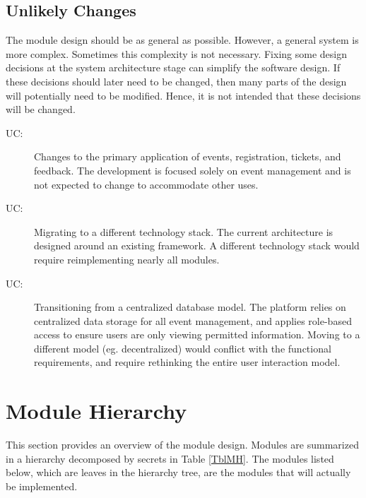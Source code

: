 \documentclass[12pt, titlepage]{article}
\newcounter{ucnum}
\newcommand{\uctheucnum}{UC\theucnum}
\begin{document}
\subsection{Unlikely Changes} \label{SecUchange}

The module design should be as general as possible. However, a general system is
more complex. Sometimes this complexity is not necessary. Fixing some design
decisions at the system architecture stage can simplify the software design. If
these decisions should later need to be changed, then many parts of the design
will potentially need to be modified. Hence, it is not intended that these
decisions will be changed.

\begin{description}
\item[ \uctheucnum \label{ucUse}:] 
  Changes to the primary application of events, registration, tickets, and feedback. The development is focused solely on event management and is not expected to change to accommodate other uses.
\item[ \uctheucnum \label{ucStack}:] 
  Migrating to a different technology stack. The current architecture is designed around an existing framework. A different technology stack would require reimplementing nearly all modules.
\item[ \uctheucnum \label{ucData}:] 
  Transitioning from a centralized database model. The platform relies on centralized data storage for all event management, and applies role-based access to ensure users are only viewing permitted information. Moving to a different model (eg. decentralized) would conflict with the functional requirements, and require rethinking the entire user interaction model.
\end{description}


\section{Module Hierarchy} \label{SecMH}

This section provides an overview of the module design. Modules are summarized
in a hierarchy decomposed by secrets in Table \ref{TblMH}. The modules listed
below, which are leaves in the hierarchy tree, are the modules that will
actually be implemented.
\end{document}
